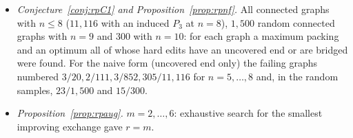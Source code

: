 \begin{itemize}
\item \emph{Conjecture~\ref{conj:rpC1} and Proposition~\ref{prop:rpnf}.} All connected graphs with $n\le8$ ($11{,}116$ with an induced $P_3$ at $n=8$), $1{,}500$ random connected graphs with $n=9$ and $300$ with $n=10$: for each graph a maximum packing and an optimum all of whose hard edits have an uncovered end or are bridged were found. For the naive form (uncovered end only) the failing graphs numbered $3/20,2/111,3/852,305/11{,}116$ for $n=5,\dots,8$ and, in the random samples, $23/1{,}500$ and $15/300$.
\item \emph{Proposition~\ref{prop:rpaug}.} $m=2,\dots,6$: exhaustive search for the smallest improving exchange gave $r=m$.
\end{itemize}
